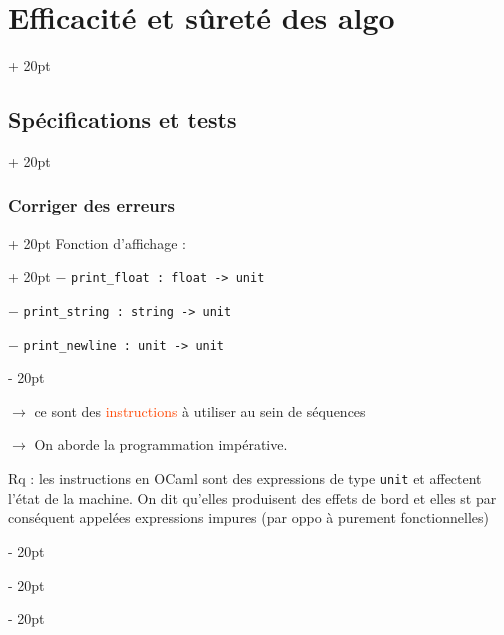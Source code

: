\documentclass[a4paper, 12pt, twoside]{article}
\renewcommand{\emph}{\textcolor{ff4500}}
\newcommand{\ind}[1][20pt]{\advance\leftskip + #1}
\newcommand{\deind}[1][20pt]{\advance\leftskip - #1}
\newenvironment{indentedenv}[1][20pt]{\par \ind[#1]}{\par \deind}
\newenvironment{indt}[2][20pt]{#2 \begin{indentedenv}[#1]}{\end{indentedenv}} %
\begin{document}
\begin{indt}{\section{Efficacité et sûreté des algo}}
\begin{indt}{\subsection{Spécifications et tests}}
\begin{indt}{\subsubsection{Corriger des erreurs}}
\begin{indt}{Fonction d'affichage :}
                    $-$ \texttt{print\_float : float -> unit}
                    
                    $-$ \texttt{print\_string : string -> unit}
                    
                    $-$ \texttt{print\_newline : unit -> unit}
                \end{indt}
                
                $\rightarrow$ ce sont des \emph{instructions} à utiliser au sein de séquences
                
                $\rightarrow$ On aborde la programmation impérative.
                
                \vspace{6pt}
                
                Rq : les instructions en OCaml sont des expressions de type \texttt{unit} et affectent l'état de la machine.
                On dit qu'elles produisent des effets de bord et elles st par conséquent appelées expressions impures (par oppo à purement fonctionnelles)
                
            \end{indt}
        
        \end{indt}
        
    \end{indt}
    
    \vspace{24pt}
    
\end{document}
